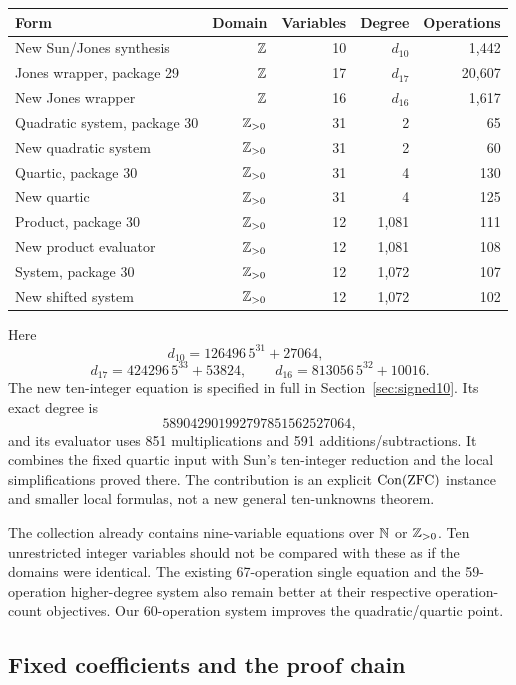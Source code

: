 \begin{center}
\small
\begin{tabular}{@{}p{43mm}rrrr@{}}
\toprule
Form & Domain & Variables & Degree & Operations\\
\midrule
New Sun/Jones synthesis & $\mathbb Z$ & 10 & $d_{10}$ & 1,442\\
Jones wrapper, package 29 & $\mathbb Z$ & 17 & $d_{17}$ & 20,607\\
New Jones wrapper & $\mathbb Z$ & 16 & $d_{16}$ & 1,617\\
Quadratic system, package 30 & $\mathbb Z_{>0}$ & 31 & 2 & 65\\
New quadratic system & $\mathbb Z_{>0}$ & 31 & 2 & 60\\
Quartic, package 30 & $\mathbb Z_{>0}$ & 31 & 4 & 130\\
New quartic & $\mathbb Z_{>0}$ & 31 & 4 & 125\\
Product, package 30 & $\mathbb Z_{>0}$ & 12 & 1,081 & 111\\
New product evaluator & $\mathbb Z_{>0}$ & 12 & 1,081 & 108\\
System, package 30 & $\mathbb Z_{>0}$ & 12 & 1,072 & 107\\
New shifted system & $\mathbb Z_{>0}$ & 12 & 1,072 & 102\\
\bottomrule
\end{tabular}
\end{center}
Here
\[
 d_{10}=126496\,5^{31}+27064,\qquad
\]
\[
 d_{17}=424296\,5^{33}+53824,\qquad
 d_{16}=813056\,5^{32}+10016.
\]
The new ten-integer equation is specified in full in
Section~\ref{sec:signed10}.  Its exact degree is
\[
589042901992797851562527064,
\]
and its evaluator uses 851 multiplications
and 591 additions/subtractions.  It combines the fixed quartic input
with Sun's ten-integer reduction \cite{sun2021,sun2026} and the local
simplifications proved there.  The contribution is an explicit
$\operatorname{Con}(\mathrm{ZFC})$ instance and smaller local formulas, not a new general
ten-unknowns theorem.

The collection already contains nine-variable equations over
$\mathbb N$ or $\mathbb Z_{>0}$.  Ten unrestricted integer variables should not be
compared with these as if the domains were identical.  The existing
67-operation single equation and the 59-operation higher-degree system
also remain better at their respective operation-count objectives.
Our 60-operation system improves the quadratic/quartic point.

\subsection{Fixed coefficients and the proof chain}

